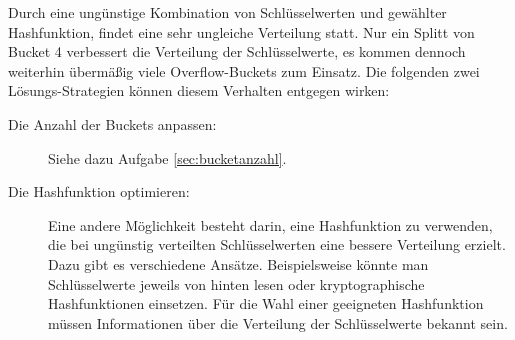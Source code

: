\begin{enumerate}[a)]
\begin{solution}
Durch eine ungünstige Kombination von Schlüsselwerten und gewählter Hashfunktion, findet eine sehr ungleiche Verteilung statt.
Nur ein Splitt von Bucket 4 verbessert die Verteilung der Schlüsselwerte, es kommen dennoch weiterhin übermäßig viele Overflow-Buckets zum Einsatz.
Die folgenden zwei Lösungs-Strategien können diesem Verhalten entgegen wirken:
\begin{description}
\item [Die Anzahl der Buckets anpassen:] Siehe dazu Aufgabe \ref{sec:bucketanzahl}.
\item [Die Hashfunktion optimieren:] Eine andere Möglichkeit besteht darin, eine Hashfunktion zu verwenden, die bei ungünstig verteilten Schlüsselwerten eine bessere Verteilung erzielt. Dazu gibt es verschiedene Ansätze. Beispielsweise könnte man Schlüsselwerte jeweils von hinten lesen oder kryptographische Hashfunktionen einsetzen.
Für die Wahl einer geeigneten Hashfunktion müssen Informationen über die Verteilung der Schlüsselwerte bekannt sein.
\end{description}
\end{solution}
\end{enumerate}
